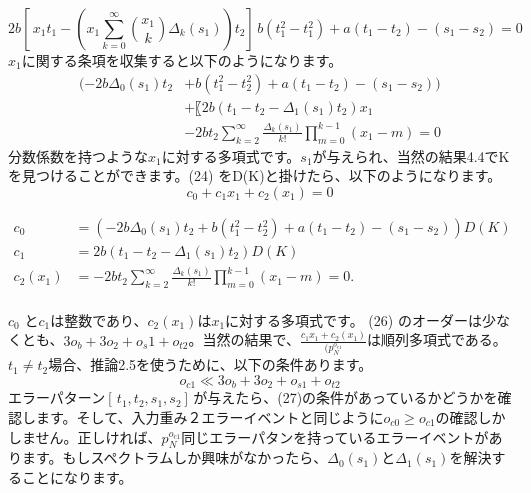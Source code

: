 \documentclass[20 pts]{article}
\begin{document}
\begin{equation}\tag{23}
2b[\,x_1t_1-(x_1\sum_{k=0}^\infty {x_1 \choose k}\Delta_k(s_1))t_2]\, b(t_1^2-t_1^2)+a(t_1-t_2)-(s_1-s_2)=0
\end{equation}
$x_1$に関する条項を収集すると以下のようになります。
\begin{equation}\tag{24}
\begin{split}
(-2b\Delta_0 (s_1 ) t_2&+b(t_1^2-t_2^2)+a(t_1-t_2)-(s_1-s_2))\\
&+〖2b(t_1-t_2-\Delta_1 (s_1 ) t_2)x_1\\
&-2bt_2 \sum_{k=2}^\infty \frac{\Delta_k (s_1 )}{k!} \prod_{m=0}^{k-1}(x_1 -m)=0
\end{split}   
\end{equation}
分数係数を持つような$x_1$に対する多項式です。$s_1$が与えられ、当然の結果4.4でKを見つけることができます。(24) をD(K)と掛けたら、以下のようになります。
\begin{equation}\tag{25}
c_0+c_1 x_1+c_2 (x_1 )=0
\end{equation}

\begin{align*}
c_0&=(-2b\Delta_0 (s_1 ) t_2+b(t_1^2-t_2^2)+a(t_1-t_2)-(s_1-s_2))D(K)\\
c_1&=2b(t_1-t_2-\Delta_1 (s_1 ) t_2)D(K)\\
c_2 (x_1 )&=-2bt_2 \sum_{k=2}^\infty \frac{\Delta_k (s_1 )}{k!} \prod_{m=0}^{k-1}(x_1 -m)=0.\tag{26}
\end{align*}
\paragraph{}
$c_0$ と$c_1$は整数であり、$c_2 (x_1 )$は$x_1$に対する多項式です。
(26) のオーダーは少なくとも、$3o_b+3o_2+o_s1+o_{t2}$。当然の結果で、$\frac{c_1 x_1+c_2 (x_1 )}{(p_N^{o_{c1} }}$は順列多項式である。$t_1\neq t_2$場合、推論2.5を使うために、以下の条件あります。
\begin{equation}　\tag{27}
o_{c1}\ll3o_b+3o_2+o_{s1}+o_{t2}\end{equation}							
エラーパターン$[\,t_1 , t_2  , s_1 ,  s_2]\,$が与えたら、(27)の条件があっているかどうかを確認します。そして、入力重み２エラーイベントと同じように$o_{c0}  \geq o_{c1}$の確認しかしません。正しければ、$p_N^{o_{c1}}$同じエラーパタンを持っているエラーイベントがあります。もしスペクトラムしか興味がなかったら、$\Delta_0 (s_1 )$と$\Delta_1 (s_1 )$を解決することになります。
\end{document}
